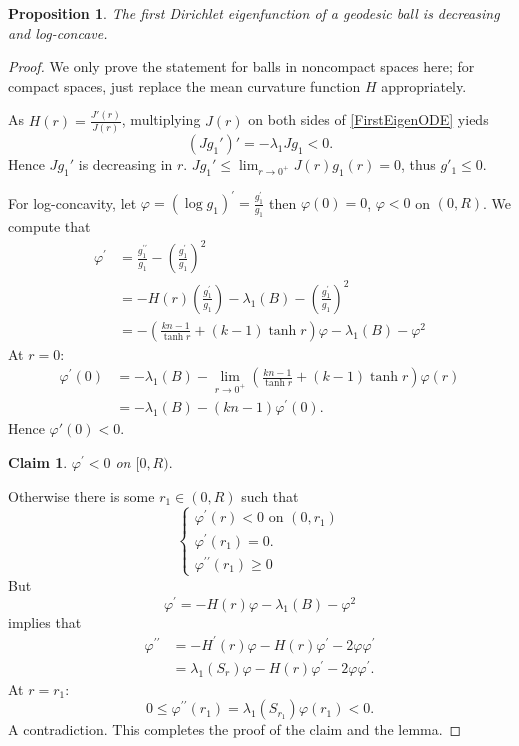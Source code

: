 \documentclass[10pt,a4paper]{amsart}
\newtheorem{prop}{Proposition}
\newtheorem{claim}{Claim}
\begin{document}
\begin{prop}\label{g1decreasinglogconcave}
    The first Dirichlet eigenfunction of a geodesic ball is decreasing and log-concave.
\end{prop}

\begin{proof}
    We only prove the statement for balls in noncompact spaces here; for compact spaces, just replace the mean curvature function $H$ appropriately. 
    \par As $H(r) = \frac{J'(r)}{J(r)}$, multiplying $J(r)$ on both sides of \cref{FirstEigenODE} yieds
    \[\left( J g_1'\right)' = -\lambda_1 Jg_1<0.\] Hence $Jg_1'$ is decreasing in $r$. $Jg_1'\leq \lim_{r\to 0^+} J(r)g_1(r)= 0$, thus $g'_1 \leq 0$.
    \par For log-concavity, let $\varphi=\left(\log g_1\right)^{\prime}=\frac{g_1^{\prime}}{g_1}$ then $\varphi(0)=0$, $\varphi<0$ on $(0, R)$. We compute that
    \[\begin{aligned}
\varphi^{\prime} & =\frac{g_1^{\prime \prime}}{g_1}-\left(\frac{g_1^{\prime}}{g_1}\right)^2\\
&=-H(r)\left(\frac{g_1^{\prime}}{g_1}\right)-\lambda_1(B)-\left(\frac{g_1^{\prime}}{g_1}\right)^2 \\
& =-\left(\frac{kn-1}{\tanh r}+(k-1) \tanh r\right) \varphi-\lambda_1(B)-\varphi^2
\end{aligned}\] At $r=0:$
\[\begin{aligned}
     \varphi^{\prime}(0) &=-\lambda_1(B)-\lim _{r \rightarrow 0^{+}}\left(\frac{kn-1}{\tanh r}+(k-1) \tanh r\right) \varphi(r)\\
    &=-\lambda_1(B)-(k n-1) \varphi^{\prime}(0) .
\end{aligned}\]
Hence $\varphi'(0)<0.$ 
\begin{claim}
  $\varphi^{\prime}<0$ on $[0, R).$  
\end{claim}
Otherwise there is some $r_1\in (0,R)$ such that
\begin{equation*}
\left\{\begin{array}{l}
\varphi^{\prime}(r)<0 \text { on } (0,r_1)\\
\varphi^{\prime}\left(r_1\right)=0 . \\
\varphi^{\prime \prime}\left(r_1\right) \geqslant 0
\end{array}\right.
\end{equation*}
But \[\varphi^{\prime}=-H(r) \varphi-\lambda_1(B)-\varphi^2\] implies that
\[\begin{aligned}
\varphi^{\prime \prime} & =-H^{\prime}(r) \varphi-H(r) \varphi^{\prime}-2 \varphi \varphi^{\prime} \\
& =\lambda_1\left(S_r\right) \varphi-H(r) \varphi^{\prime}-2 \varphi \varphi^{\prime} .
\end{aligned}\]
At $r=r_1$: \[0 \leq \varphi^{\prime \prime}\left(r_1\right)=\lambda_1\left(S_{r_1}\right) \varphi\left(r_1\right)<0.\] 
A contradiction. This completes the proof of the claim and the lemma.

\end{proof}
\end{document}
